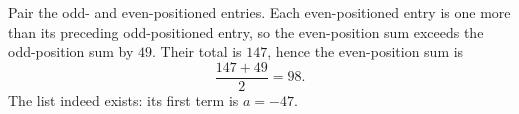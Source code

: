 Pair the odd- and even-positioned entries. Each even-positioned entry is one more than its preceding odd-positioned entry, so the even-position sum exceeds the odd-position sum by $49$. Their total is $147$, hence the even-position sum is
\[
\boxed{\dfrac{147+49}{2}=98}.
\]
The list indeed exists: its first term is $a=-47$.
